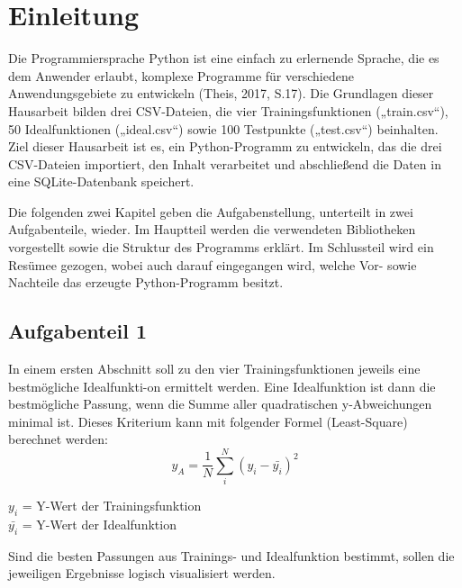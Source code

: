 \documentclass[
    a4paper, 								%
    oneside, 								%
    11pt, 									%
    listof=totoc, 					%
    bibliography=totoc, 		%
    final, 									%
    numbers=noenddot
]{scrreprt}
\begin{document}
\listoffigures

\listoftables
\newpage





\chapter{Einleitung}
\label{cha:Einleitung}
Die Programmiersprache Python ist eine einfach zu erlernende Sprache, die es dem Anwender erlaubt, komplexe Programme für verschiedene Anwendungsgebiete zu entwickeln (Theis, 2017, S.17).
Die Grundlagen dieser Hausarbeit bilden drei CSV-Dateien, die vier Trainingsfunktionen („train.csv“), 50 Idealfunktionen („ideal.csv“) sowie 100 Testpunkte („test.csv“) beinhalten.
Ziel dieser Hausarbeit ist es, ein Python-Programm zu entwickeln, das die drei CSV-Dateien importiert, den Inhalt verarbeitet und abschließend die Daten in eine SQLite-Datenbank speichert.

Die folgenden zwei Kapitel geben die Aufgabenstellung, unterteilt in zwei Aufgabenteile, wieder. Im Hauptteil werden die verwendeten Bibliotheken vorgestellt sowie die Struktur des Programms erklärt. Im Schlussteil wird ein Resümee gezogen, wobei auch darauf eingegangen wird, welche Vor- sowie Nachteile das erzeugte Python-Programm besitzt. 


\section{Aufgabenteil 1}
\label{sec:Aufgabenteil1}

In einem ersten Abschnitt soll zu den vier Trainingsfunktionen jeweils eine bestmögliche Idealfunkti-on ermittelt werden. Eine Idealfunktion ist dann die bestmögliche Passung, wenn die Summe aller quadratischen y-Abweichungen minimal ist. Dieses Kriterium kann mit folgender Formel (Least-Square) berechnet werden:
\begin{equation}
\label{eq:leastsquare}
y_{A}= \frac{1}{N}\sum_{i}^{N} (y_{i}-\bar{y_{i}})^2 
\end{equation}
\begin{flushleft}
$y_{i}$ = Y-Wert der Trainingsfunktion \\
$\bar{y_{i}}$ = Y-Wert der Idealfunktion
\end{flushleft}
Sind die besten Passungen aus Trainings- und Idealfunktion bestimmt, sollen die jeweiligen Ergebnisse logisch visualisiert werden.
\end{document}
